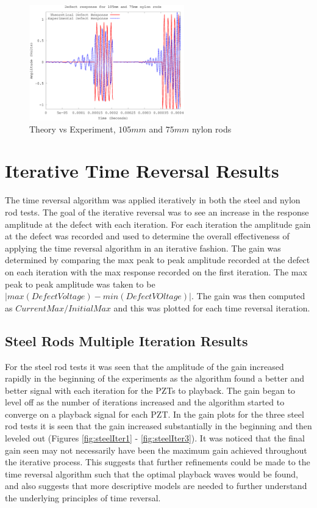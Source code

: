  \begin{figure}[ht!]
 \centering
 \includegraphics[width=0.6\textwidth]{eps_pics/nylon-3-4_Iter_th_exp.eps}
 \caption{Theory vs Experiment, $105 mm$ and $75 mm$ nylon rods
 	 \label{fig:nylonThExp3}} 
 \end{figure}
 
 
 \section{Iterative Time Reversal Results}
 The time reversal algorithm was applied iteratively in both the steel and nylon rod tests. The goal of the iterative reversal was to see an increase in the response amplitude at the defect with each iteration. For each iteration the amplitude gain at the defect was recorded and used to determine the overall effectiveness of applying the time  reversal algorithm in an iterative fashion. The gain was determined by comparing the max peak to peak amplitude recorded at the defect on each iteration with the max response recorded on the first iteration. The max peak to peak amplitude was taken to be $|max(DefectVoltage) - min(DefectVOltage)|$. The gain was then computed as $CurrentMax / InitialMax$ and this was plotted for each time reversal iteration. 
 
 \subsection{Steel Rods Multiple Iteration Results}
 For the steel rod tests it was seen that the amplitude of the gain increased rapidly in the beginning of the experiments as the algorithm found a better and better signal with each iteration for the PZTs to playback. The gain began to level off as the number of iterations increased and the algorithm started to converge on a playback signal for each PZT. In the gain plots for the three steel rod tests it is seen that the gain increased substantially in the beginning and then leveled out (Figures \ref{fig:steelIter1} - \ref{fig:steelIter3}). It was noticed that the final gain seen may not necessarily have been the maximum gain achieved throughout the iterative process. This suggests that further refinements could be made to the time reversal algorithm such that the optimal playback waves would be found, and also suggests that more descriptive models are needed to further understand the underlying principles of time reversal.

